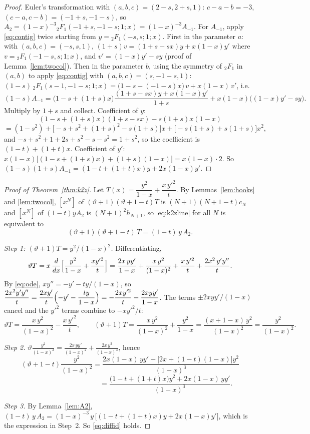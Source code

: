 \documentclass[11pt]{article}
\theoremstyle{definition}
\theoremstyle{remark}
\newcommand{\F}[4]{{}_2F_1\!\left(#1,#2;#3;#4\right)}
\begin{document}
\begin{proof}
Euler's transformation with $(a,b,c)=(2-s,2+s,1)$: $c-a-b=-3$, $(c-a,c-b)=(-1+s,-1-s)$, so $A_2=(1-x)^{-3}\F{-1+s}{-1-s}1x=(1-x)^{-3}A_{-1}$. For $A_{-1}$, apply \eqref{eq:contig} twice starting from $y=\F{-s}{s}1x$. First in the parameter $a$: with $(a,b,c)=(-s,s,1)$, $(1+s)v=(1+s-sx)y+x(1-x)y'$ where $v=\F{-1-s}s1x$, and $v'=(1-x)y'-sy$ (proof of Lemma~\ref{lem:twocol}). Then in the parameter $b$, using the symmetry of ${}_2F_1$ in $(a,b)$ to apply \eqref{eq:contig} with $(a,b,c)=(s,-1-s,1)$: $(1-s)\,\F{s-1}{-1-s}1x=\bigl(1-s-(-1-s)x\bigr)\,v+x(1-x)\,v'$, i.e.
\[
(1-s)A_{-1}=\bigl(1-s+(1+s)x\bigr)\frac{(1+s-sx)y+x(1-x)y'}{1+s}+x(1-x)\bigl((1-x)y'-sy\bigr).
\]
Multiply by $1+s$ and collect. Coefficient of $y$:
\[
(1-s+(1+s)x)(1+s-sx)-s(1+s)x(1-x)
\]
\[
=(1-s^2)+\bigl[-s+s^2+(1+s)^2-s(1+s)\bigr]x+\bigl[-s(1+s)+s(1+s)\bigr]x^2,
\]
and $-s+s^2+1+2s+s^2-s-s^2=1+s^2$, so the coefficient is $(1-t)+(1+t)x$. Coefficient of $y'$: $x(1-x)\bigl[(1-s+(1+s)x)+(1+s)(1-x)\bigr]=x(1-x)\cdot2$. So $(1-s)(1+s)A_{-1}=(1-t+(1+t)x)y+2x(1-x)y'$.
\end{proof}

\begin{proof}[Proof of Theorem~\ref{thm:k2z}]
Let $T(x)=\dfrac{y^2}{1-x}+\dfrac{x\,y'^2}{t}$. By Lemmas~\ref{lem:hooks} and \ref{lem:twocol}, $[x^N]$ of $(\vartheta+1)(\vartheta+1-t)T$ is $(N+1)(N+1-t)c_N$ and $[x^N]$ of $(1-t)yA_2$ is $(N+1)^2h_{N+1}$, so \eqref{eq:k2zline} for all $N$ is equivalent to
\begin{equation}\label{eq:diffid}
(\vartheta+1)(\vartheta+1-t)\,T=(1-t)\,y\,A_2 .
\end{equation}

\emph{Step 1: $(\vartheta+1)T=y^2/(1-x)^2$.} Differentiating,
\[
\vartheta T=x\,\frac{d}{dx}\Bigl[\frac{y^2}{1-x}+\frac{xy'^2}t\Bigr]=\frac{2x\,yy'}{1-x}+\frac{x\,y^2}{(1-x)^2}+\frac{x\,y'^2}{t}+\frac{2x^2\,y'y''}{t}.
\]
By \eqref{eq:ode}, $xy''=-y'-ty/(1-x)$, so $\dfrac{2x^2y'y''}{t}=\dfrac{2xy'}{t}\Bigl(-y'-\dfrac{ty}{1-x}\Bigr)=-\dfrac{2xy'^2}{t}-\dfrac{2xyy'}{1-x}$. The terms $\pm2xyy'/(1-x)$ cancel and the $y'^2$ terms combine to $-xy'^2/t$:
\[
\vartheta T=\frac{x\,y^2}{(1-x)^2}-\frac{x\,y'^2}{t},\qquad
(\vartheta+1)T=\frac{x\,y^2}{(1-x)^2}+\frac{y^2}{1-x}=\frac{(x+1-x)\,y^2}{(1-x)^2}=\frac{y^2}{(1-x)^2}.
\]

\emph{Step 2.} $\displaystyle\vartheta\frac{y^2}{(1-x)^2}=\frac{2x\,yy'}{(1-x)^2}+\frac{2x\,y^2}{(1-x)^3}$, hence
\[
(\vartheta+1-t)\frac{y^2}{(1-x)^2}=\frac{2x(1-x)\,yy'+\bigl[2x+(1-t)(1-x)\bigr]y^2}{(1-x)^3}
\]
\[
\phantom{(\vartheta+1-t)\frac{y^2}{(1-x)^2}}=\frac{\bigl(1-t+(1+t)x\bigr)y^2+2x(1-x)\,yy'}{(1-x)^3}.
\]

\emph{Step 3.} By Lemma~\ref{lem:A2}, $(1-t)\,y\,A_2=(1-x)^{-3}\,y\,\bigl[(1-t+(1+t)x)y+2x(1-x)y'\bigr]$, which is the expression in Step~2. So \eqref{eq:diffid} holds.
\end{proof}
\end{document}
